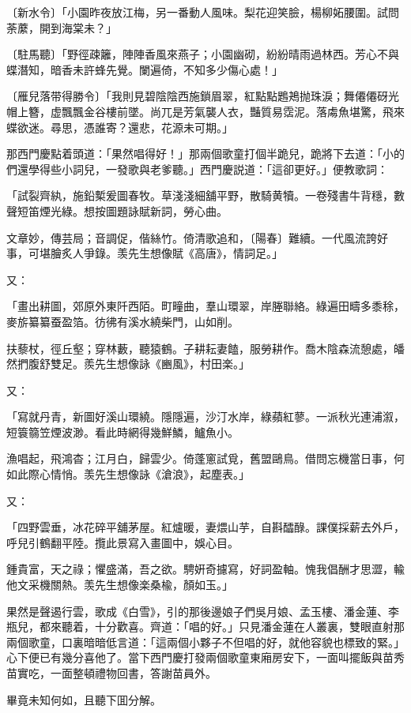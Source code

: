 \begin{myquote}
{\markfont〔新水令〕}「小園昨夜放江梅，另一番動人風味。梨花迎笑臉，楊柳妬腰圍。試問荼䕷，開到海棠未？」

{\markfont〔駐馬聽〕}「野徑疎籬，陣陣香風來燕子；小園幽砌，紛紛晴雨過林西。芳心不與蝶潛知，暗香未許蜂先覺。闌遍倚，不知多少傷心處！」

{\markfont〔雁兒落带得勝令〕}「我則見碧陰陰西施鎖眉翠，紅點點鶗鴂抛珠淚；舞僊僊砑光帽上簪，虚飄飄金谷樓前墜。尚兀是芳氣襲人衣，豔質易霑泥。落䖏魚堪驚，飛來蝶欲迷。尋思，憑誰寄？還悲，花源未可期。」
\end{myquote}

那西門慶點着頭道：「果然唱得好！」那兩個歌童打個半跪兒，跪將下去道：「小的們還學得些小詞兒，一發歌與老爹聽。」西門慶説道：「這卻更好。」便教歌詞：

\begin{myquote}
「試裂齊紈，施鉛槧爰圖春牧。草淺淺細舖平野，散騎黄犢。一卷殘書牛背穩，數聲短笛煙光綠。想按圖題詠賦新詞，勞心曲。

文章妙，傳芸局；音調促，偕絲竹。倚清歌追和，〔陽春〕難續。一代風流誇好事，可堪膾炙人爭錄。羡先生想像賦《高唐》，情詞足。」
\end{myquote}

又：

\begin{myquote}
「畫出耕圖，郊原外東阡西陌。町疃曲，羣山環翠，岸塍聯絡。綠遍田疇多黍稌，麥旂纂纂蚕盈箔。彷彿有溪水繞柴門，山如削。

扶藜杖，徑丘壑；穿林藪，聽猿鶴。子耕耘妻饁，服勞耕作。喬木陰森流憩處，皤然捫腹舒雙足。羨先生想像詠《豳風》，村田楽。」
\end{myquote}

又：

\begin{myquote}
「寫就丹青，新圖好溪山環繞。隱隱遍，沙汀水岸，綠蘋紅蓼。一派秋光連浦溆，短簑篛笠煙波渺。看此時網得幾鮮鱗，鱸魚小。

漁唱起，飛鴻杳；江月白，歸雲少。倚蓬窻試覓，舊盟鷗鳥。借問忘機當日事，何如此際心情悄。羡先生想像詠《滄浪》，起塵表。」
\end{myquote}

又：

\begin{myquote}
「四野雲垂，冰花碎平舖茅屋。紅爐暖，妻煨山芋，自斟醽醁。課僕採薪去外戶，呼兒引鶴翻平陸。攬此景寫入畫圖中，娛心目。

鍾貴富，天之祿；懼盛滿，吾之欲。騁姸奇攄寫，好詞盈軸。愧我倡酬才思澀，輸他文采機關熱。羡先生想像楽桑楡，顏如玉。」
\end{myquote}

果然是聲遏行雲，歌成《白雪》，引的那後邊娘子們吳月娘、孟玉樓、潘金蓮、李瓶兒，都來聽着，十分歡喜。齊道：「唱的好。」只見潘金蓮在人叢裏，雙眼直射那兩個歌童，口裏暗暗低言道：「這兩個小夥子不但唱的好，就他容貌也標致的緊。」心下便已有幾分喜他了。當下西門慶打發兩個歌童東廂房安下，一面叫擺飯與苗秀苗實吃，一面整頓禮物回書，答謝苗員外。

畢竟未知何如，且聽下囬分解。

